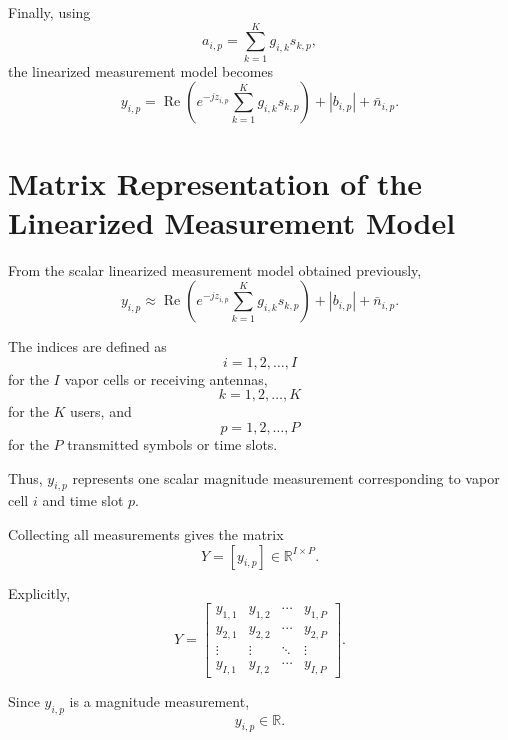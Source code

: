\documentclass[12pt,a4paper]{article}
\begin{document}
Finally, using
\begin{equation}
a_{i,p}
=
\sum_{k=1}^{K}
g_{i,k}s_{k,p},
\tag{129}
\end{equation}
the linearized measurement model becomes
\begin{equation}
\boxed{
y_{i,p}
=
\operatorname{Re}
\left(
e^{-jz_{i,p}}
\sum_{k=1}^{K}
g_{i,k}s_{k,p}
\right)
+
|b_{i,p}|
+
\bar n_{i,p}
}.
\tag{130}
\end{equation}

\section{Matrix Representation of the Linearized Measurement Model}

From the scalar linearized measurement model obtained previously,
\begin{equation}
y_{i,p}
\approx
\operatorname{Re}
\left(
e^{-jz_{i,p}}
\sum_{k=1}^{K}
g_{i,k}s_{k,p}
\right)
+
|b_{i,p}|
+
\bar n_{i,p}.
\tag{131}
\end{equation}

The indices are defined as
\[
i=1,2,\ldots,I
\]
for the $I$ vapor cells or receiving antennas,
\[
k=1,2,\ldots,K
\]
for the $K$ users, and
\[
p=1,2,\ldots,P
\]
for the $P$ transmitted symbols or time slots.

Thus, $y_{i,p}$ represents one scalar magnitude measurement
corresponding to vapor cell $i$ and time slot $p$.

Collecting all measurements gives the matrix
\begin{equation}
\boxed{
Y=[y_{i,p}]
\in
\mathbb{R}^{I\times P}
}.
\tag{132}
\end{equation}

Explicitly,
\begin{equation}
Y=
\begin{bmatrix}
y_{1,1} & y_{1,2} & \cdots & y_{1,P}\\
y_{2,1} & y_{2,2} & \cdots & y_{2,P}\\
\vdots & \vdots & \ddots & \vdots\\
y_{I,1} & y_{I,2} & \cdots & y_{I,P}
\end{bmatrix}.
\tag{133}
\end{equation}

Since $y_{i,p}$ is a magnitude measurement,
\begin{equation}
y_{i,p}\in\mathbb{R}.
\tag{134}
\end{equation}
\end{document}
